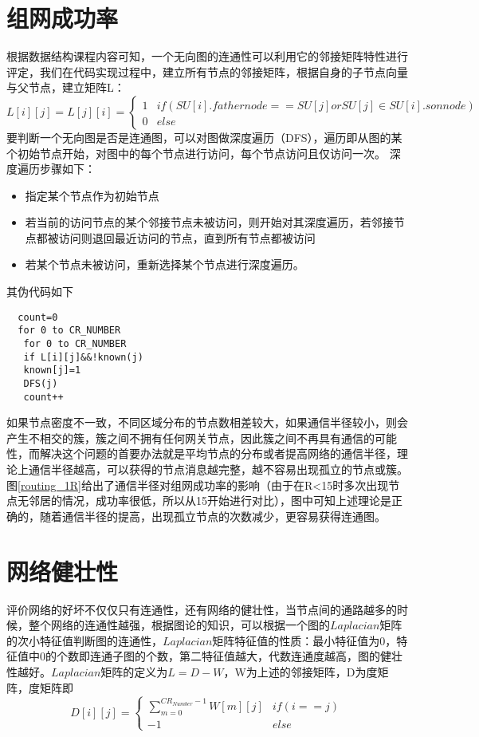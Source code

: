 \documentclass[a4paper,AutoFakeBold,oneside,12pt]{book}
\begin{document}
  \section{组网成功率}
  根据数据结构课程内容可知，一个无向图的连通性可以利用它的邻接矩阵特性进行评定，我们在代码实现过程中，建立所有节点的邻接矩阵，根据自身的子节点向量与父节点，建立矩阵L：
  \begin{equation}
  L[i][j]= L[j][i] =
\left\{  
             \begin{array}{lr}  
             1 &if (SU[i].fathernode==SU[j] or SU[j]\in SU[i].sonnode)  \\  
       
             0 &else
             \end{array}  
\right.  
\end{equation}
  要判断一个无向图是否是连通图，可以对图做深度遍历（DFS），遍历即从图的某个初始节点开始，对图中的每个节点进行访问，每个节点访问且仅访问一次。
  深度遍历步骤如下：
  \begin{itemize}
  \item 指定某个节点作为初始节点
  \item 若当前的访问节点的某个邻接节点未被访问，则开始对其深度遍历，若邻接节点都被访问则退回最近访问的节点，直到所有节点都被访问
  \item 若某个节点未被访问，重新选择某个节点进行深度遍历。
  \end{itemize}
  其伪代码如下
  \begin{lstlisting}
  count=0
  for 0 to CR_NUMBER
   for 0 to CR_NUMBER
   if L[i][j]&&!known(j)
   known[j]=1
   DFS(j)
   count++
\end{lstlisting}
  如果节点密度不一致，不同区域分布的节点数相差较大，如果通信半径较小，则会产生不相交的簇，簇之间不拥有任何网关节点，因此簇之间不再具有通信的可能性，而解决这个问题的首要办法就是平均节点的分布或者提高网络的通信半径，理论上通信半径越高，可以获得的节点消息越完整，越不容易出现孤立的节点或簇。图\ref{routing_1R}给出了通信半径对组网成功率的影响（由于在R<15时多次出现节点无邻居的情况，成功率很低，所以从15开始进行对比），图中可知上述理论是正确的，随着通信半径的提高，出现孤立节点的次数减少，更容易获得连通图。
  
  \section{网络健壮性}
  评价网络的好坏不仅仅只有连通性，还有网络的健壮性，当节点间的通路越多的时候，整个网络的连通性越强，根据图论的知识，可以根据一个图的$Laplacian$矩阵的次小特征值判断图的连通性，$Laplacian$矩阵特征值的性质：最小特征值为0，特征值中0的个数即连通子图的个数，第二特征值越大，代数连通度越高，图的健壮性越好。$Laplacian$矩阵的定义为$L=D-W$，W为上述的邻接矩阵，D为度矩阵，度矩阵即
   \begin{equation}
  D[i][j]=
\left\{  
             \begin{array}{lr}  
             
           \displaystyle { \sum_{m=0}^{CR_{Number}-1}} W[m][j] &if(i==j)\\  
             -1 &else
             \end{array}  
\right.  
\end{equation}
  
\end{document}
